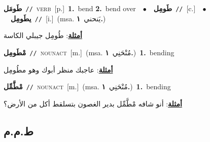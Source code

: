 \documentclass[10pt,a4paper,twoside]{article} %
\begin{document}
\begin{multicols}{2}
{\setlength\topsep{0pt}\textbf{\foreignlanguage{arabic}{طَومَل}}\ {\color{gray}\texttt{//}\color{black}}\ \textsc{verb}\ [p.]\ \textbf{1.}~bend  \textbf{2.}~bend over\ \ $\bullet$\ \ \setlength\topsep{0pt}\textbf{\foreignlanguage{arabic}{طَومِل}}\ {\color{gray}\texttt{//}\color{black}}\ [c.]\ \ $\bullet$\ \ \setlength\topsep{0pt}\textbf{\foreignlanguage{arabic}{يطَومِل}}\ {\color{gray}\texttt{//}\color{black}}\ [i.]\ \color{gray}(msa. \foreignlanguage{arabic}{يَنحني}~\foreignlanguage{arabic}{\textbf{١.}})\color{black}\  \begin{flushright}\color{gray}\foreignlanguage{arabic}{\textbf{\underline{\foreignlanguage{arabic}{أمثلة}}}: طُومِل جيبلي الكاسة}\end{flushright}\color{black}} \vspace{2mm}

{\setlength\topsep{0pt}\textbf{\foreignlanguage{arabic}{مْطَومِل}}\ {\color{gray}\texttt{//}\color{black}}\ \textsc{noun\textunderscore act}\ [m.]\ \color{gray}(msa. \foreignlanguage{arabic}{مُنْحَنِي}~\foreignlanguage{arabic}{\textbf{١.}})\color{black}\ \textbf{1.}~bending\  \begin{flushright}\color{gray}\foreignlanguage{arabic}{\textbf{\underline{\foreignlanguage{arabic}{أمثلة}}}: عاجبك منظر أبوك وهو مطُومِل}\end{flushright}\color{black}} \vspace{2mm}

{\setlength\topsep{0pt}\textbf{\foreignlanguage{arabic}{مْطَّمِّل}}\ {\color{gray}\texttt{//}\color{black}}\ \textsc{noun\textunderscore act}\ [m.]\ \color{gray}(msa. \foreignlanguage{arabic}{مُنْحَنِي}~\foreignlanguage{arabic}{\textbf{١.}})\color{black}\ \textbf{1.}~bending\  \begin{flushright}\color{gray}\foreignlanguage{arabic}{\textbf{\underline{\foreignlanguage{arabic}{أمثلة}}}: أنو شافه مْطَّمِّل بدير الغصون بتسلقط أكل من الأرض؟}\end{flushright}\color{black}} \vspace{2mm}

\vspace{-3mm}
\subsection*{\color{blue}\foreignlanguage{arabic}{ط.م.م}\color{blue}{}} 


\end{multicols}
\end{document}
